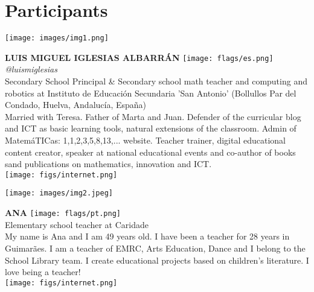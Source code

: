 \section*{Participants}
\noindent
\begin{minipage}{0.3\textwidth}
\centering
\texttt{[image: images/img1.png]}
\end{minipage}
\hfill
\begin{minipage}{0.6\textwidth}\raggedright
\color{color1}\uppercase{\textbf{Luis Miguel Iglesias Albarrán}}
\color{color2}\hspace{0.2cm}\texttt{[image: flags/es.png]}
\hspace{0.2cm}\textit{@luismiglesias}
\\
Secondary School Principal \& Secondary school math teacher and computing and robotics at Instituto de Educación Secundaria 'San Antonio' (Bollullos Par del Condado, Huelva, Andalucía, España)\\
{\footnotesize Married with Teresa. Father of Marta and Juan. Defender of the curricular blog and ICT as basic learning tools, natural extensions of the classroom. Admin of MatemáTICas: 1,1,2,3,5,8,13,... website. Teacher trainer, digital educational content creator, speaker at national educational events and co-author of books sand publications on mathematics, innovation and ICT.}\\
\texttt{[image: figs/internet.png]}
\end{minipage}
\newline\newline\newline

\noindent
\begin{minipage}{0.3\textwidth}
\centering
\texttt{[image: images/img2.jpeg]}
\end{minipage}
\hfill
\begin{minipage}{0.6\textwidth}\raggedright
\color{color1}\uppercase{\textbf{Ana }}
\color{color2}\hspace{0.2cm}\texttt{[image: flags/pt.png]}
\\
Elementary school teacher at Caridade\\
{\footnotesize My name is Ana and I am 49 years old. I have been a teacher for 28 years in Guimarães. I am a teacher of EMRC, Arts Education, Dance and I belong to the School Library team. I create educational projects based on children's literature.
I love being a teacher!}\\
\texttt{[image: figs/internet.png]}
\end{minipage}
\newline\newline\newline


